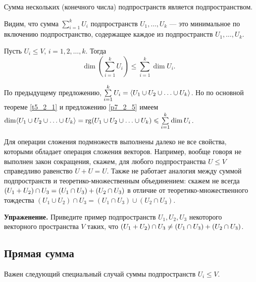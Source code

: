 \begin{sled}
Сумма нескольких (конечного числа) подпространств является подпространством.
\end{sled}

Видим, что сумма $\sum\limits_{i=1}^k U_i$ подпространств $U_1, \ldots , U_k$ --- это минимальное по включению подпространство,
содержащее каждое из подпространств $U_1, \ldots,  U_k$.


\begin{predl}\label{p7_4_3}
Пусть $U_i\leq V$, $i=1, 2, \ldots , k$.
Тогда $$\dim \left(\sum\limits_{i=1}^k U_i \right) \leq \sum\limits_{i=1}^k \dim U_i.$$
\end{predl}
\dok
По предыдущему предложению, $\sum\limits_{i=1}^k U_i =
\langle U_1 \cup U_2 \cup \ldots \cup U_k \rangle$.
Но по основной теореме \ref{t5_2_1} и предложению
\ref{p7_2_5} имеем $\dim \lin{U_1 \cup U_2 \cup \ldots \cup U_k} \hm=
\rg(U_1 \cup U_2 \cup \ldots \cup U_k) \leq
\sum\limits_{i=1}^k \dim U_i$.
\edok

\otstup

Для операции сложения подмножеств выполнены далеко не все свойства, которыми обладает операция сложения векторов.
Например, вообще говоря не выполнен закон сокращения, скажем, для любого подпространства $U\leq V$
справедливо равенство $U+U=U$.
Также не работает аналогия между суммой подпространств и теоретико-множественным
объединением: скажем не всегда
$(U_1+U_2)\cap U_3 \hm= (U_1\cap U_3)+(U_2\cap U_3)$
в отличие от теоретико-множественного тождества $(U_1\cup U_2)\cap U_3 = (U_1\cap U_3)\cup (U_2\cap U_3)$.

\otstup

{\bf Упраженение.} Приведите пример подпространств $U_1, U_2, U_3$ некоторого векторного пространства $V$ таких, что
$(U_1+U_2)\cap U_3 \hm\neq (U_1\cap U_3)+(U_2\cap U_3)$. 

\subsection{Прямая сумма}

Важен следующий специальный случай суммы подпространств $U_i\leq V$.




